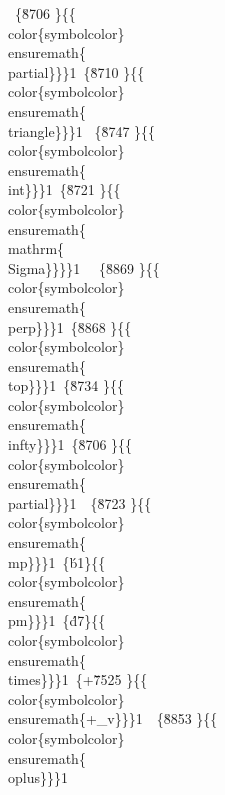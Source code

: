{\
\{\u8706 \}\{\{\\color\{symbolcolor\}\\ensuremath\{\\partial\}\}\}1\
\{\u8710 \}\{\{\\color\{symbolcolor\}\\ensuremath\{\\triangle\}\}\}1 %
\
\{\u8747 \}\{\{\\color\{symbolcolor\}\\ensuremath\{\\int\}\}\}1\
\{\u8721 \}\{\{\\color\{symbolcolor\}\\ensuremath\{\\mathrm\{\\Sigma\}\}\}\}1\
\
\{\u8869 \}\{\{\\color\{symbolcolor\}\\ensuremath\{\\perp\}\}\}1\
\{\u8868 \}\{\{\\color\{symbolcolor\}\\ensuremath\{\\top\}\}\}1\
\{\u8734 \}\{\{\\color\{symbolcolor\}\\ensuremath\{\\infty\}\}\}1\
\{\uc0\u8706 \}\{\{\\color\{symbolcolor\}\\ensuremath\{\\partial\}\}\}1\
\
\{\uc0\u8723 \}\{\{\\color\{symbolcolor\}\\ensuremath\{\\mp\}\}\}1\
\{\'b1\}\{\{\\color\{symbolcolor\}\\ensuremath\{\\pm\}\}\}1\
\{\'d7\}\{\{\\color\{symbolcolor\}\\ensuremath\{\\times\}\}\}1\
\{+\uc0\u7525 \}\{\{\\color\{symbolcolor\}\\ensuremath\{+_v\}\}\}1\
\
\{\uc0\u8853 \}\{\{\\color\{symbolcolor\}\\ensuremath\{\\oplus\}\}\}1\
}
